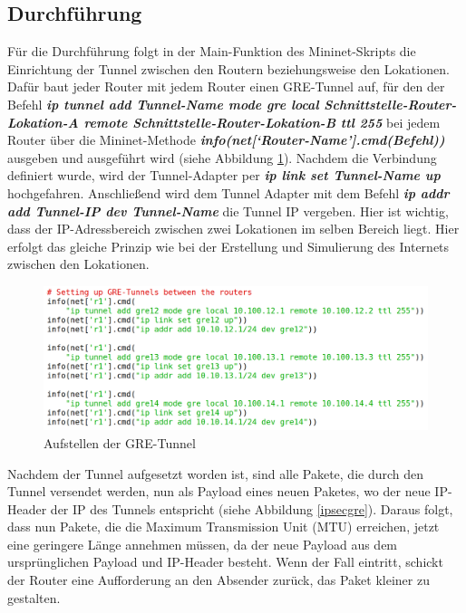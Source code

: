 \documentclass[fontsize=12pt,paper=a4,open=any,parskip=half,
  twoside=false,toc=listof,toc=bibliography,fleqn,leqno,
  captions=nooneline,captions=tableabove,british]{scrbook}
\begin{document}
\subsection{Durchführung}
Für die Durchführung folgt in der Main-Funktion des Mininet-Skripts die Einrichtung der Tunnel zwischen den Routern beziehungsweise den Lokationen. Dafür baut jeder Router mit jedem Router einen GRE-Tunnel auf, für den der Befehl \textit{\textbf{ip tunnel add Tunnel-Name mode gre local Schnittstelle\hyp{}Router\hyp{}Lokation\hyp{}A remote Schnittstelle\hyp{}Router\hyp{}Lokation\hyp{}B ttl 255}} bei jedem Router über die Mininet-Methode \textit{\textbf{info(net[‘Router\hyp{}Name'].cmd(Befehl))}} ausgeben und ausgeführt wird (siehe Abbildung \ref{gre}). Nachdem die Verbindung definiert wurde, wird der Tunnel-Adapter per \textit{\textbf{ip link set Tunnel-Name up}} hochgefahren. Anschließend wird dem Tunnel Adapter mit dem Befehl \textit{\textbf{ip addr add Tunnel-IP dev Tunnel-Name}} die Tunnel IP vergeben. Hier ist wichtig, dass der IP-Adressbereich zwischen zwei Lokationen im selben Bereich liegt. Hier erfolgt das gleiche Prinzip wie bei der Erstellung und Simulierung des Internets zwischen den Lokationen.

\begin{figure}[H]
 \centering
 \includegraphics[width=1.0\textwidth]{Bilder/gre}
 \captionsetup{justification=centering,margin=2cm}
 \caption{Aufstellen der GRE-Tunnel}
 \label{gre}
\end{figure}

Nachdem der Tunnel aufgesetzt worden ist, sind alle Pakete, die durch den Tunnel versendet werden, nun als Payload eines neuen Paketes, wo der neue IP-Header der IP des Tunnels entspricht (siehe Abbildung \ref{ipsecgre}). Daraus folgt, dass nun Pakete, die die Maximum Transmission Unit (MTU) erreichen, jetzt eine geringere Länge annehmen müssen, da der neue Payload aus dem ursprünglichen Payload und IP-Header besteht. Wenn der Fall eintritt, schickt der Router eine Aufforderung an den Absender zurück, das Paket kleiner zu gestalten.
\end{document}
